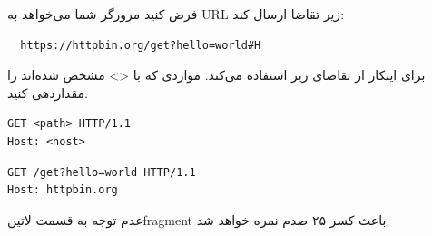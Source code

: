 
فرض کنید مرورگر شما می‌خواهد به URL زیر تقاضا ارسال کند:

\begin{latin}
\begin{verbatim}
  https://httpbin.org/get?hello=world#H
\end{verbatim}
\end{latin}

برای اینکار از تقاضای زیر استفاده می‌کند. مواردی که با <> مشخص شده‌اند را مقداردهی کنید.

\begin{latin}
\begin{verbatim}
GET <path> HTTP/1.1
Host: <host>
\end{verbatim}
\end{latin}


\begin{latin}
\begin{verbatim}
GET /get?hello=world HTTP/1.1
Host: httpbin.org
\end{verbatim}
\end{latin}

عدم توجه به قسمت ‌لاتین{fragment} باعث کسر ۲۵ صدم نمره خواهد شد.


